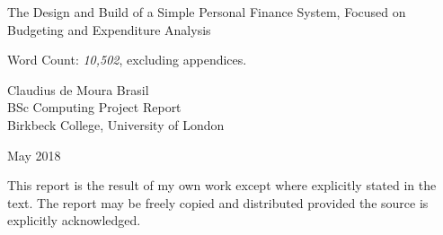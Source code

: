 \begin{titlepage}
  \center
  
  \vspace*{3cm}

  {
    \begin{spacing}{1.2}
      \LARGE The Design and Build of a Simple Personal Finance System, Focused
      on Budgeting and Expenditure Analysis
    \end{spacing}
  }

  \vfill
  
  Word Count: \emph{10,502}, excluding appendices.
  
  \vfill

  Claudius de Moura Brasil\\
  BSc Computing Project Report\\
  Birkbeck College, University of London

  May 2018

  This report is the result of my own work except where explicitly stated in
  the text. The report may be freely copied and distributed provided the source
  is explicitly acknowledged.
  
  \vfill

\end{titlepage}
